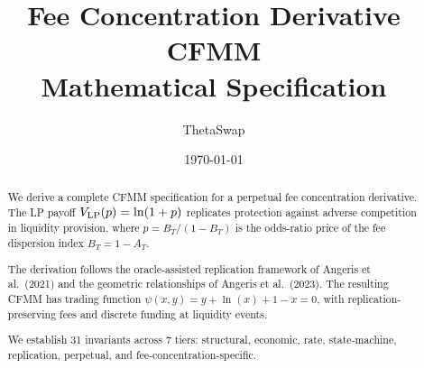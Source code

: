 \documentclass[11pt,a4paper]{article}
\title{Fee Concentration Derivative CFMM\\[4pt]
       \large Mathematical Specification}
\author{ThetaSwap}
\date{\today}
\begin{document}
\maketitle

\begin{abstract}
We derive a complete CFMM specification for a perpetual fee concentration
derivative. The LP payoff $V_{\mathrm{LP}}(p) = \ln(1+p)$ replicates protection against
adverse competition in liquidity provision, where $p = B_T/(1-B_T)$ is the
odds-ratio price of the fee dispersion index $B_T = 1 - A_T$.

The derivation follows the oracle-assisted replication framework of
Angeris et al.\ (2021) and the geometric relationships of
Angeris et al.\ (2023). The resulting CFMM has trading function
$\psi(x,y) = y + \ln(x) + 1 - x = 0$, with replication-preserving fees
and discrete funding at liquidity events.

We establish 31 invariants across 7 tiers: structural, economic, rate,
state-machine, replication, perpetual, and fee-concentration-specific.
\end{abstract}

\tableofcontents











\end{document}
